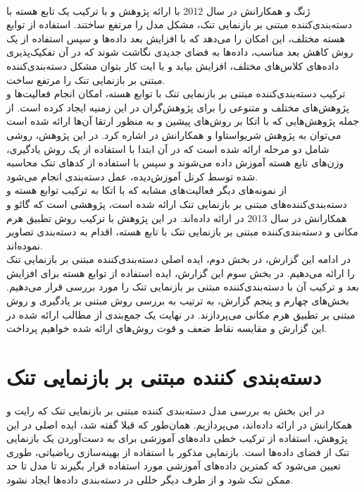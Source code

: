 \documentclass[12pt,twocolumn]{article}
\begin{document}
\\
ژنگ و همکارانش در سال 2012 با ارائه پژوهش \cite{zhang2012kernel} و با ترکیب یک تابع هسته با دسته‌بندی‌کننده مبتنی بر بازنمایی تنک، مشکل مدل \cite{wright2009robust} را مرتفع ساختند. استفاده از توابع هسته مختلف، این امکان را می‌دهد که با افزایش بعد داده‌ها و سپس استفاده از یک روش کاهش بعد مناسب، داده‌ها به فضای جدیدی نگاشت شوند که در آن تفکیک‌پذیری داده‌های کلاس‌های مختلف، افزایش بیابد و با ایت کار بتوان مشکل دسته‌بندی‌کننده مبتنی بر بازنمایی تنک را مرتفع ساخت.
\\
ترکیب دسته‌بندی‌کننده مبتنی بر بازنمایی تنک با توابع هسته، امکان انجام فعالیت‌ها و پژوهش‌های مختلف و متنوعی را برای پژوهش‌گران در این زمنیه ایجاد کرده است. از جمله پژوهش‌هایی که با اتکا بر روش‌های پیشین و به منظور ارتقا آن‌ها ارائه شده است می‌توان به پژوهش شریواستاوا و همکارانش در \cite{shrivastava2014multiple} اشاره کرد. در این پژوهش، روشی شامل دو مرحله ارائه شده است که در آن ابتدا با استفاده از یک روش یادگیری، وزن‌های تابع هسته آموزش داده می‌شوند و سپس با استفاده از کد‌های تنک محاسبه شده توسط کرنل آموزش‌دیده، عمل دسته‌بندی انجام می‌شود.
\\
از نمونه‌های دیگر فعالیت‌های مشابه که با اتکا به ترکیب توابع هسته و دسته‌بندی‌کننده‌های مبتنی بر بازنمایی تنک ارائه شده است، پژوهشی است که گائو و همکارانش در سال 2013 در \cite{gao2013sparse} ارائه داده‌اند. در این پژوهش با ترکیب روش تطبیق هرم مکانی و دسته‌بندی‌کننده مبتنی بر بازنمایی تنک با تابع هسته، اقدام به دسته‌بندی تصاویر نموده‌اند.
\\
در ادامه این گزارش، در بخش دوم، ایده اصلی دسته‌بندی‌کننده مبتنی بر بازنمایی تنک را ارائه می‌دهیم. در بخش سوم این گزارش، ایده استفاده از توابع هسته برای افزایش بعد و ترکیب آن با دسته‌بندی‌کننده مبتنی بر بازنمایی تنک را مورد بررسی قرار می‌دهیم. بخش‌های چهارم و پنجم گزارش، به ترتیب به بررسی روش مبتنی بر یادگیری و روش مبتنی بر تطبیق هرم مکانی می‌پردازند. در نهایت یک جمع‌بندی از مطالب ارائه شده در این گزارش و مقایسه نقاط ضعف و قوت روش‌های ارائه شده خواهیم پرداخت.
\\


\section{دسته‌بندی کننده مبتنی بر بازنمایی تنک}
در این بخش به بررسی مدل دسته‌بندی کننده مبتنی بر بازنمایی تنک که رایت و همکارانش در \cite{wright2009robust} ارائه داده‌اند، می‌پردازیم. همان‌طور که قبلا گفته شد، ایده اصلی در این پژوهش، استفاده از ترکیب خطی داده‌های آموزشی برای به دست‌آوردن یک بازنمایی تنک از فضای داده‌ها است. بازنمایی مذکور با استفاده از بهینه‌سازی ریاضیاتی، طوری تعیین می‌شود که کمترین داده‌های آموزشی مورد استفاده قرار بگیرند تا مدل تا حد ممکن تنک شود  و از طرف دیگر خللی در دسته‌بندی داده‌ها ایجاد نشود.
\end{document}

